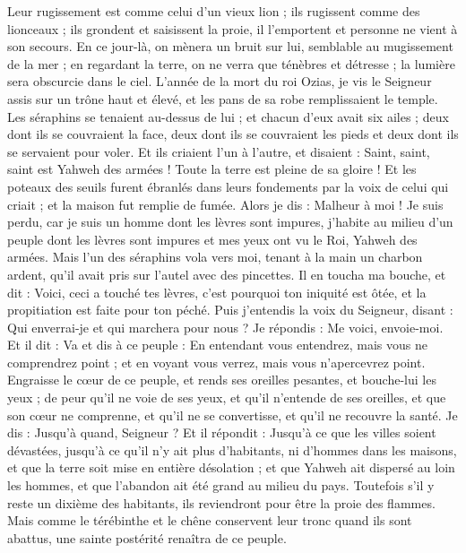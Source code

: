 \begin{multicols}{2}
Leur rugissement est comme celui d'un vieux lion ; ils rugissent comme des lionceaux ; ils grondent et saisissent la proie, il l'emportent et personne ne vient à son secours.
En ce jour-là, on mènera un bruit sur lui, semblable au mugissement de la mer ; en regardant la terre, on ne verra que ténèbres et détresse ; la lumière sera obscurcie dans le ciel.
\VerseOne{}L'année de la mort du roi Ozias, je vis le Seigneur assis sur un trône haut et élevé, et les pans de sa robe remplissaient le temple.
Les séraphins se tenaient au-dessus de lui ; et chacun d'eux avait six ailes ; deux dont ils se couvraient la face, deux dont ils se couvraient les pieds et deux dont ils se servaient pour voler.
Et ils criaient l'un à l'autre, et disaient : Saint, saint, saint est Yahweh des armées ! Toute la terre est pleine de sa gloire !
Et les poteaux des seuils furent ébranlés dans leurs fondements par la voix de celui qui criait ; et la maison fut remplie de fumée.
Alors je dis : Malheur à moi ! Je suis perdu, car je suis un homme dont les lèvres sont impures, j'habite au milieu d'un peuple dont les lèvres sont impures et mes yeux ont vu le Roi, Yahweh des armées.
Mais l'un des séraphins vola vers moi, tenant à la main un charbon ardent, qu'il avait pris sur l'autel avec des pincettes.
Il en toucha ma bouche, et dit : Voici, ceci a touché tes lèvres, c'est pourquoi ton iniquité est ôtée, et la propitiation est faite pour ton péché.
Puis j'entendis la voix du Seigneur, disant : Qui enverrai-je et qui marchera pour nous ? Je répondis : Me voici, envoie-moi.
Et il dit : Va et dis à ce peuple : En entendant vous entendrez, mais vous ne comprendrez point ; et en voyant vous verrez, mais vous n'apercevrez point.
Engraisse le cœur de ce peuple, et rends ses oreilles pesantes, et bouche-lui les yeux ; de peur qu'il ne voie de ses yeux, et qu'il n'entende de ses oreilles, et que son cœur ne comprenne, et qu'il ne se convertisse, et qu'il ne recouvre la santé.
Je dis : Jusqu'à quand, Seigneur ? Et il répondit : Jusqu'à ce que les villes soient dévastées, jusqu'à ce qu'il n'y ait plus d'habitants, ni d'hommes dans les maisons, et que la terre soit mise en entière désolation ;
 et que Yahweh ait dispersé au loin les hommes, et que l'abandon ait été grand au milieu du pays.
Toutefois s'il y reste un dixième des habitants, ils reviendront pour être la proie des flammes. Mais comme le térébinthe et le chêne conservent leur tronc quand ils sont abattus, une sainte postérité renaîtra de ce peuple.

\end{multicols}
